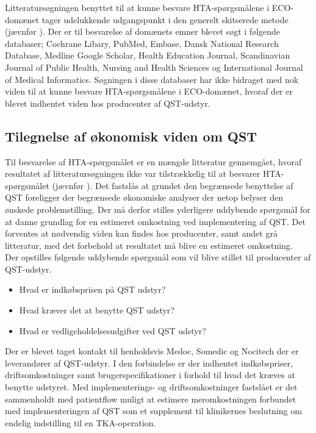 Litteratursøgningen benyttet til at kunne besvare HTA-spørgsmålene i ECO-domænet tager udelukkende udgangspunkt i den generelt skitserede metode (jævnfør ). Der er til besvarelse af domænets emner blevet søgt i følgende databaser; Cochrane Libary, PubMed, Embase, Dansk National Research Database, Medline Google Scholar, Health Education Journal, Scandinavian Journal of Public Health, Nursing and Health Sciences og International Journal of Medical Informatics. Søgningen i disse databaser har ikke bidraget med nok viden til at kunne besvare HTA-spørgsmålene i ECO-domænet, hvoraf der er blevet indhentet viden hos producenter af QST-udstyr.


\subsection{Tilegnelse af økonomisk viden om QST}
Til besvarelse af HTA-spørgsmålet er en mængde litteratur gennemgået, hvoraf resultatet af litteratursøgningen ikke var tilstrækkelig til at besvarer HTA-spørgsmålet (jævnfør ). Det fastslås at grundet den begrænsede benyttelse af QST foreligger der begrænsede økonomiske analyser der netop belyser den ønskede problemstilling. Der må derfor stilles yderligere uddybende spørgsmål for at danne grundlag for en estimeret omkostning ved implementering af QST. Det forventes at nødvendig viden kan findes hos producenter, samt andet grå litteratur, med det forbehold at resultatet må blive en estimeret omkostning.\\ 
Der opstilles følgende uddybende spørgsmål som vil blive stillet til producenter af QST-udstyr.

\begin{itemize}  
\item Hvad er indkøbsprisen på QST udstyr? 
\item Hvad kræver det at benytte QST udstyr? 
\item Hvad er vedligeholdelsesudgifter ved QST udstyr?
\end{itemize}

Der er blevet taget kontakt til henholdsvis Medoc, Somedic og Nocitech der er leverandører af QST-udstyr. I den forbindelse er der indhentet indkøbspriser, driftsomkostninger samt brugerspecifikationer i forhold til hvad det kræves at benytte udstyret. Med implementerings- og driftsomkostninger fastslået er det sammenholdt med patientflow muligt at estimere meromkostningen forbundet med implementeringen af QST som et supplement til klinikernes beslutning om endelig indstilling til en TKA-operation. 

